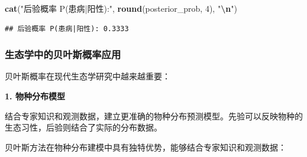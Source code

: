 \documentclass[
  twoside]{book}
\newenvironment{Shaded}{\begin{snugshade}}{\end{snugshade}}
\newcommand{\DecValTok}[1]{\textcolor[rgb]{0.00,0.00,0.81}{#1}}
\newcommand{\FunctionTok}[1]{\textcolor[rgb]{0.13,0.29,0.53}{\textbf{#1}}}
\newcommand{\NormalTok}[1]{#1}
\newcommand{\SpecialCharTok}[1]{\textcolor[rgb]{0.81,0.36,0.00}{\textbf{#1}}}
\newcommand{\StringTok}[1]{\textcolor[rgb]{0.31,0.60,0.02}{#1}}
\begin{document}
\begin{Shaded}
\begin{Highlighting}[]
\FunctionTok{cat}\NormalTok{(}\StringTok{"后验概率 P(患病|阳性):"}\NormalTok{, }\FunctionTok{round}\NormalTok{(posterior\_prob, }\DecValTok{4}\NormalTok{), }\StringTok{"}\SpecialCharTok{\textbackslash{}n}\StringTok{"}\NormalTok{)}
\end{Highlighting}
\end{Shaded}

\begin{verbatim}
## 后验概率 P(患病|阳性): 0.3333
\end{verbatim}

\hypertarget{ux751fux6001ux5b66ux4e2dux7684ux8d1dux53f6ux65afux6982ux7387ux5e94ux7528}{%
\subsubsection{生态学中的贝叶斯概率应用}\label{ux751fux6001ux5b66ux4e2dux7684ux8d1dux53f6ux65afux6982ux7387ux5e94ux7528}}

贝叶斯概率在现代生态学研究中越来越重要：

\textbf{1. 物种分布模型}

结合专家知识和观测数据，建立更准确的物种分布预测模型。先验可以反映物种的生态习性，后验则结合了实际的分布数据。

贝叶斯方法在物种分布建模中具有独特优势，能够结合专家知识和观测数据：
\end{document}
